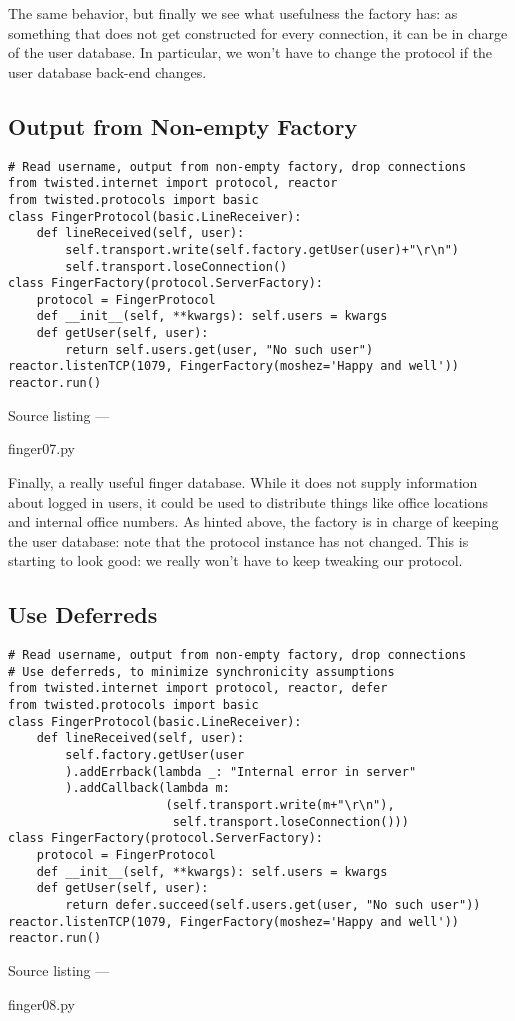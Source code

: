 The same behavior, but finally we see what usefulness the factory has: as something that does not get constructed for every connection, it can be in charge of the user database. In particular, we won't have to change the protocol if the user database back-end changes.

\subsection{Output from Non-empty Factory}
\begin{verbatim}
# Read username, output from non-empty factory, drop connections
from twisted.internet import protocol, reactor
from twisted.protocols import basic
class FingerProtocol(basic.LineReceiver):
    def lineReceived(self, user):
        self.transport.write(self.factory.getUser(user)+"\r\n")
        self.transport.loseConnection()
class FingerFactory(protocol.ServerFactory):
    protocol = FingerProtocol
    def __init__(self, **kwargs): self.users = kwargs
    def getUser(self, user):
        return self.users.get(user, "No such user")
reactor.listenTCP(1079, FingerFactory(moshez='Happy and well'))
reactor.run()
\end{verbatim}\parbox[b]{\linewidth}{\begin{center}Source listing --- \begin{em}finger07.py\end{em}\end{center}}

Finally, a really useful finger database. While it does not supply information about logged in users, it could be used to distribute things like office locations and internal office numbers. As hinted above, the factory is in charge of keeping the user database: note that the protocol instance has not changed. This is starting to look good: we really won't have to keep tweaking our protocol.

\subsection{Use Deferreds}
\begin{verbatim}
# Read username, output from non-empty factory, drop connections
# Use deferreds, to minimize synchronicity assumptions
from twisted.internet import protocol, reactor, defer
from twisted.protocols import basic
class FingerProtocol(basic.LineReceiver):
    def lineReceived(self, user):
        self.factory.getUser(user
        ).addErrback(lambda _: "Internal error in server"
        ).addCallback(lambda m:
                      (self.transport.write(m+"\r\n"),
                       self.transport.loseConnection()))
class FingerFactory(protocol.ServerFactory):
    protocol = FingerProtocol
    def __init__(self, **kwargs): self.users = kwargs
    def getUser(self, user):
        return defer.succeed(self.users.get(user, "No such user"))
reactor.listenTCP(1079, FingerFactory(moshez='Happy and well'))
reactor.run()
\end{verbatim}\parbox[b]{\linewidth}{\begin{center}Source listing --- \begin{em}finger08.py\end{em}\end{center}}

